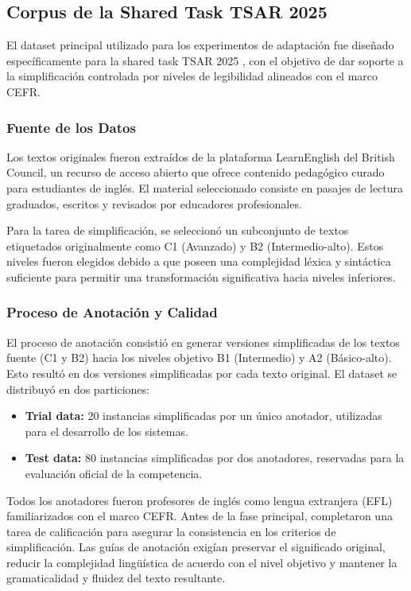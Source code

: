 \subsection{Corpus de la Shared Task TSAR 2025}\label{subsection:dataset_tsar}
El dataset principal utilizado para los experimentos de adaptación fue diseñado específicamente para la shared task TSAR 2025 \parencite{alva-manchego-etal-2025-findings}, con el objetivo de dar soporte a la simplificación controlada por niveles de legibilidad alineados con el marco CEFR.

\subsubsection*{Fuente de los Datos}
Los textos originales fueron extraídos de la plataforma LearnEnglish del British Council, un recurso de acceso abierto que ofrece contenido pedagógico curado para estudiantes de inglés. El material seleccionado consiste en pasajes de lectura graduados, escritos y revisados por educadores profesionales.

Para la tarea de simplificación, se seleccionó un subconjunto de textos etiquetados originalmente como C1 (Avanzado) y B2 (Intermedio-alto). Estos niveles fueron elegidos debido a que poseen una complejidad léxica y sintáctica suficiente para permitir una transformación significativa hacia niveles inferiores.

\subsubsection*{Proceso de Anotación y Calidad}
El proceso de anotación consistió en generar versiones simplificadas de los textos fuente (C1 y B2) hacia los niveles objetivo B1 (Intermedio) y A2 (Básico-alto). Esto resultó en dos versiones simplificadas por cada texto original. El dataset se distribuyó en dos particiones:
\begin{itemize}
\item \textbf{Trial data:} 20 instancias simplificadas por un único anotador, utilizadas para el desarrollo de los sistemas.
\item \textbf{Test data:} 80 instancias simplificadas por dos anotadores, reservadas para la evaluación oficial de la competencia.
\end{itemize}

Todos los anotadores fueron profesores de inglés como lengua extranjera (EFL) familiarizados con el marco CEFR. Antes de la fase principal, completaron una tarea de calificación para asegurar la consistencia en los criterios de simplificación. Las guías de anotación exigían preservar el significado original, reducir la complejidad lingüística de acuerdo con el nivel objetivo y mantener la gramaticalidad y fluidez del texto resultante.


